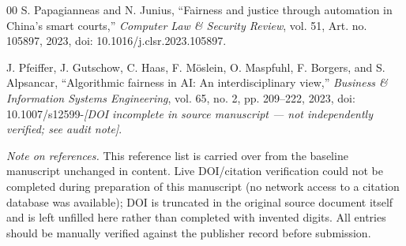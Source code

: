 \documentclass[conference]{IEEEtran}
\begin{document}
\begin{thebibliography}{00}
 S. Papagianneas and N. Junius, ``Fairness and
justice through automation in China's smart courts,'' \emph{Computer Law
\& Security Review}, vol. 51, Art. no. 105897, 2023, doi:
10.1016/j.clsr.2023.105897.

 J. Pfeiffer, J. Gutschow, C. Haas, F. M\"{o}slein, O.
Maspfuhl, F. Borgers, and S. Alpsancar, ``Algorithmic fairness in AI: An
interdisciplinary view,'' \emph{Business \& Information Systems
Engineering}, vol. 65, no. 2, pp. 209--222, 2023, doi:
10.1007/s12599-\emph{[DOI incomplete in source manuscript --- not
independently verified; see audit note]}.

\end{thebibliography}

\vspace{6pt}
\footnotesize\noindent\emph{Note on references.} This reference list is
carried over from the baseline manuscript unchanged in content. Live
DOI/citation verification could not be completed during preparation of this
manuscript (no network access to a citation database was available); DOI
\cite{pfeiffer2023} is truncated in the original source document itself and
is left unfilled here rather than completed with invented digits. All
entries should be manually verified against the publisher record before
submission.
\end{document}
